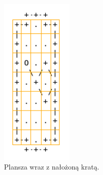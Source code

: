 \documentclass[licencjacka]{pracamgr}
\begin{document}
\begin{figure}[ht!]
  \centering
  \includegraphics[width=35mm]{feature_map_grid}
  \caption{Plansza wraz z nałożoną kratą.}
\end{figure}
\end{document}
